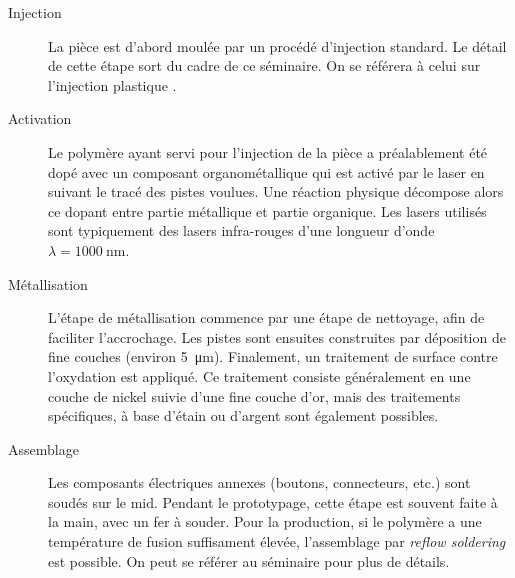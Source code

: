 \begin{description}
    \item[Injection] La pièce est d'abord moulée par un procédé d'injection standard.
        Le détail de cette étape sort du cadre de ce séminaire.
        On se référera à celui sur l'injection plastique \cite{injection-2013}.

    \item[Activation] Le polymère ayant servi pour l'injection de la pièce a préalablement été dopé avec un composant organométallique qui est activé par le laser en suivant le tracé des pistes voulues.
        Une réaction physique décompose alors ce dopant entre partie métallique et partie organique.
        Les lasers utilisés sont typiquement des lasers infra-rouges d'une longueur d'onde $\lambda = \SI{1000}{\nano\meter}$.
    \item[Métallisation] L'étape de métallisation commence par une étape de nettoyage, afin de faciliter l'accrochage.
        Les pistes sont ensuites construites par déposition de fine couches (environ \SI{5}{\micro\meter}).
        Finalement, un traitement de surface contre l'oxydation est appliqué.
        Ce traitement consiste généralement en une couche de nickel suivie d'une fine couche d'or, mais des traitements spécifiques, à base d'étain ou d'argent sont également possibles.
    \item[Assemblage] Les composants électriques annexes (boutons, connecteurs, etc.) sont soudés sur le \gls{mid}.
        Pendant le prototypage, cette étape est souvent faite à la main, avec un fer à souder.
        Pour la production, si le polymère a une température de fusion suffisament élevée, l'assemblage par \emph{reflow soldering} est possible.
        On peut se référer au séminaire \cite{smd-assembly-2013} pour plus de détails.

\end{description}


